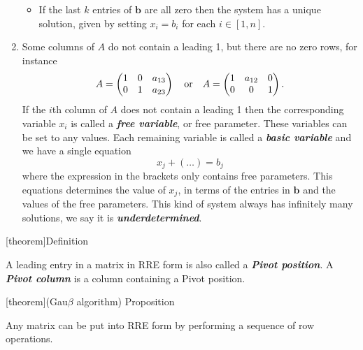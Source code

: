 \documentclass[12pt]{report}
\theoremstyle{definition}
\begin{document}
\begin{enumerate}[label = (\arabic*)]
\begin{itemize}
                \item If the last $k$ entries of $\mathbf{b}$ are all zero then the system
                    has a unique solution, given by setting $x_i = b_i$ for each $i \in [1, n]$.
        \end{itemize}
        
    \item Some columns of $A$ do not contain a leading 1, but there are no zero rows, for instance\[
        A = \begin{pmatrix}
            1 & 0 & a_{13} \\
            0 & 1 & a_{23}
        \end{pmatrix} 
        \quad \textnormal{or} \quad
        A = \begin{pmatrix}
            1 & a_{12} & 0 \\
            0 & 0 & 1
        \end{pmatrix}.
    \]
    If the $i$th column of $A$ does not contain a leading 1 then the corresponding variable $x_i$
    is called a \textbf{\emph{free variable}}, or free parameter. These variables can be set to
    any values. Each remaining variable is called a \textbf{\emph{basic variable}} and 
    we have a single equation\[
        x_j + (\ldots) = b_j
    \]
    where the expression in the brackets only contains free parameters.
    This equations determines the value of $x_j$, in terms of the entries in $\mathbf{b}$
    and the values of the free parameters.
    This kind of system always has infinitely many solutions, we say it is \textbf{\emph{underdetermined}}.
\end{enumerate}

[theorem]{Definition}
\begin{pivot position}
    A leading entry in a matrix in RRE form is also called a \textbf{\emph{Pivot position}}.
    A \textbf{\emph{Pivot column}} is a column containing a Pivot position.
\end{pivot position}

[theorem]{(Gau$\beta$ algorithm) Proposition}
\begin{Any matrix can convert to RRE}
    Any matrix can be put into RRE form by performing a sequence of row operations.
\end{Any matrix can convert to RRE}
\end{document}
